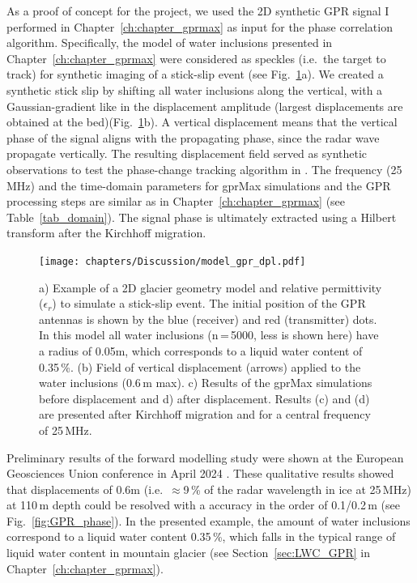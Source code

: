 As a proof of concept for the project, we used the 2D synthetic GPR signal I performed in Chapter~\ref{ch:chapter_gprmax} as input for the phase correlation algorithm. Specifically, the model of water inclusions presented in Chapter~\ref{ch:chapter_gprmax} were considered as speckles (i.e.\ the target to track) for synthetic imaging of a stick-slip event (see Fig.~\ref{fig:GPR_geometrie_dpl}a). We created a synthetic stick slip by shifting all water inclusions along the vertical, with a Gaussian-gradient like in the displacement amplitude (largest displacements are obtained at the bed)(Fig.~\ref{fig:GPR_geometrie_dpl}b). A vertical displacement means that the vertical phase of the signal aligns with the propagating phase, since the radar wave propagate vertically. The resulting displacement field served as synthetic observations to test the phase-change tracking algorithm in \cite{Aichele2019}. The frequency (25\,MHz) and the time-domain parameters for gprMax simulations and the GPR processing steps are similar as in Chapter~\ref{ch:chapter_gprmax} (see Table~\ref{tab_domain}). The signal phase is ultimately extracted using a Hilbert transform after the Kirchhoff migration.


\begin{figure}[h]
    \centering
    \texttt{[image: chapters/Discussion/model\_gpr\_dpl.pdf]}
    \caption{a) Example of a 2D glacier geometry model and relative permittivity ($\epsilon_r$) to simulate a stick-slip event. The initial position of the GPR antennas is shown by the blue (receiver) and red (transmitter) dots. In this model all water inclusions (n\,=\,5000, less is shown here) have a radius of 0.05m, which corresponds to a liquid water content of 0.35\,\%. (b) Field of vertical displacement (arrows) applied to the water inclusions (0.6\,m max). c) Results of the gprMax simulations before displacement and d) after displacement. Results (c) and (d) are presented after Kirchhoff migration and for a central frequency of 25\,MHz.}
    \label{fig:GPR_geometrie_dpl}
\end{figure}


Preliminary results of the forward modelling study were shown at the European Geosciences Union conference in April 2024 \citep{Aichele&al2024}. These qualitative results showed that displacements of 0.6m (i.e.\ $\approx$9\,\% of the radar wavelength in ice at 25\,MHz) at 110\,m depth could be resolved with a accuracy in the order of 0.1/0.2\,m (see Fig.~\ref{fig:GPR_phase}). In the presented example, the amount of water inclusions correspond to a liquid water content 0.35\,\%, which falls in the typical range of liquid water content in mountain glacier (see Section~\ref{sec:LWC_GPR} in Chapter~\ref{ch:chapter_gprmax}).


